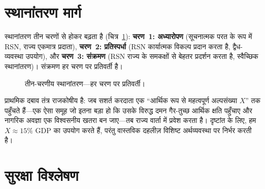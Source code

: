 \documentclass[11pt,a4paper,twocolumn]{article}
\begin{document}
\section{स्थानांतरण मार्ग}

स्थानांतरण तीन चरणों से होकर बढ़ता है (चित्र~\ref{fig:migration}): \textbf{चरण~1: अध्यारोपण} (सूचनात्मक परत के रूप में RSN, राज्य एकमात्र प्रदाता), \textbf{चरण~2: प्रतिस्पर्धा} (RSN कार्यात्मक विकल्प प्रदान करता है, द्वैध-व्यवस्था उपयोग), और \textbf{चरण~3: संक्रमण} (RSN राज्य के समकक्षों से बेहतर प्रदर्शन करता है, स्वैच्छिक स्थानांतरण)। संक्रमण हर चरण पर प्रतिवर्ती है।

\begin{figure}[ht]
\centering
{}
\caption{तीन-चरणीय स्थानांतरण---हर चरण पर प्रतिवर्ती।}
\label{fig:migration}
\end{figure}

प्राथमिक दबाव तंत्र राजकोषीय है: जब सशर्त करदाता एक ``आर्थिक रूप से महत्वपूर्ण अल्पसंख्या $X$'' तक पहुँचते हैं---एक ऐसा समूह जो इतना बड़ा हो कि उसके विरुद्ध दमन गैर-तुच्छ आर्थिक क्षति पहुँचाए और नागरिक अवज्ञा एक विश्वसनीय खतरा बन जाए---तब राज्य वार्ता में प्रवेश करता है। दृष्टांत के लिए, हम $X \approx 15\%$ GDP का उपयोग करते हैं, परंतु वास्तविक दहलीज़ विशिष्ट अर्थव्यवस्था पर निर्भर करती है।

\section{सुरक्षा विश्लेषण}
\end{document}
